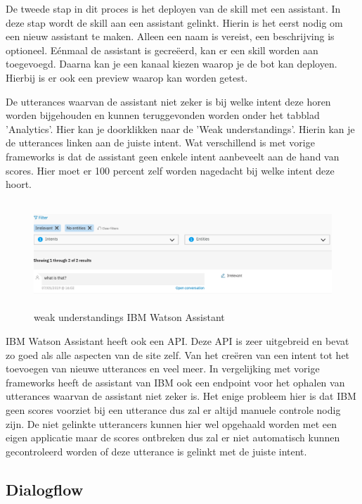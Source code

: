 De tweede stap in dit proces is het deployen van de skill met een assistant. In deze stap wordt de skill aan een assistant gelinkt. Hierin is het eerst nodig om een nieuw assistant te maken. Alleen een naam is vereist, een beschrijving is optioneel. Eénmaal de assistant is gecreëerd, kan er een skill worden aan toegevoegd. Daarna kan je een kanaal kiezen waarop je de bot kan deployen. Hierbij is er ook een preview waarop kan worden getest.

De utterances waarvan de assistant niet zeker is bij welke intent deze horen worden bijgehouden en kunnen teruggevonden worden onder het tabblad 'Analytics'. Hier kan je doorklikken naar de 'Weak understandings'. Hierin kan je de utterances linken aan de juiste intent. Wat verschillend is met vorige frameworks is dat de assistant geen enkele intent aanbeveelt aan de hand van scores. Hier moet er 100 percent zelf worden nagedacht bij welke intent deze hoort.

\begin{figure}[h!]
	\centering
	\includegraphics[height=4cm]{img/weak.png}
	\caption{weak understandings IBM Watson Assistant}
	\label{fig:weak}
\end{figure}

IBM Watson Assistant heeft ook een API. Deze API is zeer uitgebreid en bevat zo goed als alle aspecten van de site zelf. Van het creëren van een intent tot het toevoegen van nieuwe utterances en veel meer. In vergelijking met vorige frameworks heeft de assistant van IBM ook een endpoint voor het ophalen van utterances waarvan de assistant niet zeker is. Het enige probleem hier is dat IBM geen scores voorziet bij een utterance dus zal er altijd manuele controle nodig zijn. De niet gelinkte utterancers kunnen hier wel opgehaald worden met een eigen applicatie maar de scores ontbreken dus zal er niet automatisch kunnen gecontroleerd worden of deze utterance is gelinkt met de juiste intent.

\subsection{Dialogflow}
\label{dialogflow}

